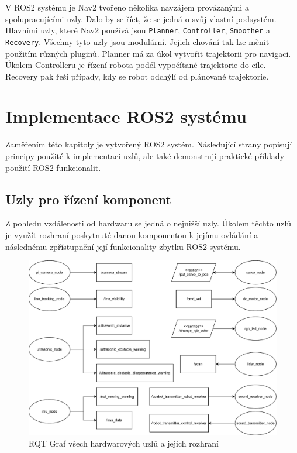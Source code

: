 V ROS2 systému je Nav2 tvořeno několika navzájem provázanými a spolupracujícími uzly. Dalo by se říct, že se jedná o svůj vlastní podsystém. Hlavními uzly, které Nav2 používá jsou \verb|Planner|, \verb|Controller|, \verb|Smoother| a \verb|Recovery|. Všechny tyto uzly jsou modulární. Jejich chování tak lze měnit použitím různých pluginů. Planner má za úkol vytvořit trajektorii pro navigaci. Úkolem Controlleru je řízení robota podél vypočítané trajektorie do cíle. Recovery pak řeší případy, kdy se robot odchýlí od plánované trajektorie. \cite{nav2_documentation}

\chapter{Implementace ROS2 systému}
Zaměřením této kapitoly je vytvořený ROS2 systém. Následující strany popisují principy použité k implementaci uzlů, ale také demonstrují praktické příklady použití ROS2 funkcionalit.

\section{Uzly pro řízení komponent}
Z pohledu vzdálenosti od hardwaru se jedná o nejnižší uzly. Úkolem těchto uzlů je využít rozhraní poskytnuté danou komponentou k jejímu ovládání a následnému zpřístupnění její funkcionality zbytku ROS2 systému.

\begin{figure}[h!]
	\centering
	\includegraphics[scale=0.5]{obrazky-figures/hardware_nodes.pdf}
	\caption{RQT Graf všech hardwarových uzlů a jejich rozhraní}
	\label{}
\end{figure}

